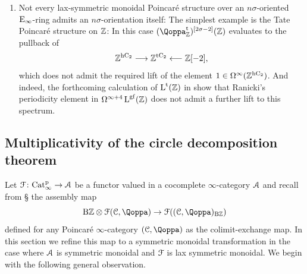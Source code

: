 \begin{examples}
\begin{enumerate}
(and by its image in $\Om^{\infty+4}\L^{\mathrm g\sym}(\mathbb Z)$ when $\lambda$ is of symmetric type). 
\item 
Not every lax-symmetric monoidal Poincar\'e structure over an $n\sigma$-oriented ${\mathrm{E}_{\infty}}$-ring admits an $n\sigma$-orientation itself: The simplest example is the Tate Poincar\'e structure on $\mathbb{Z}$: In this case
$(\QF^\tate_{\ZZ})\qshift{2\sigma-2}(\ZZ)$ evaluates to the pullback of
\[
\mathbb{Z}^{\mathrm{h}\mathrm{C_2}} \longrightarrow \mathbb{Z}^{\mathrm{t}\mathrm{C_2}} \longleftarrow \mathbb{Z}[-2],
\]
which does not admit the required lift of the element $1 \in \Omega^{\infty}(\mathbb{Z}^{\mathrm{h}\mathrm{C_2}})$. And indeed, the forthcoming calculation of $\operatorname L^{\mathrm{t}}(\mathbb{Z})$ in \cite{TateL} show that Ranicki's periodicity element in $\Omega^{\infty+4}\operatorname L^{\mathrm{g}\mathrm{f}}(\mathbb{Z})$ does not admit a further lift to this spectrum.
\end{enumerate}
\end{examples}


























\subsection{Multiplicativity of the circle decomposition theorem}
\label{subsection:mult-shaneson}%








Let $\mathcal{F}\colon \mathrm{Cat}^{\mathrm p}_\infty \to \mathcal{A}$ be a functor valued in a cocomplete $\infty$-category $\mathcal{A}$ %
and recall from \S{} the assembly map
\[
\B\ZZ \otimes \F(\C,\QF) \to \F((\C,\QF)_{\B\ZZ})
\]
defined for any Poincaré $\infty$-category $(\C,\QF)$ as the colimit-exchange map. In this section we refine this map to a symmetric monoidal transformation in the case where $\mathcal{A}$ is symmetric monoidal and $\mathcal{F}$ is lax symmetric monoidal. We begin with the following general observation.


